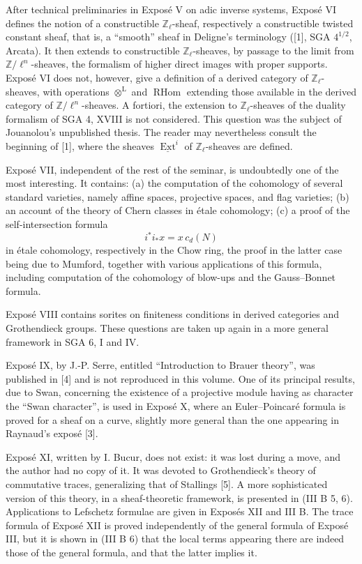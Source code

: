 \documentclass[11pt]{article}
\newcommand{\Z}{\mathbb{Z}}
\DeclareMathOperator{\RHom}{RHom}
\begin{document}
After technical preliminaries in Exposé V on adic inverse systems, Exposé VI defines the notion of a constructible $\Z_\ell$-sheaf, respectively a constructible twisted constant sheaf, that is, a ``smooth'' sheaf in Deligne's terminology ([1], SGA $4^{1/2}$, Arcata). It then extends to constructible $\Z_\ell$-sheaves, by passage to the limit from $\Z/\ell^n$-sheaves, the formalism of higher direct images with proper supports. Exposé VI does not, however, give a definition of a derived category of $\Z_\ell$-sheaves, with operations $\otimes^{\mathrm L}$ and $\RHom$ extending those available in the derived category of $\Z/\ell^n$-sheaves. A fortiori, the extension to $\Z_\ell$-sheaves of the duality formalism of SGA 4, XVIII is not considered. This question was the subject of Jouanolou's unpublished thesis. The reader may nevertheless consult the beginning of [1], where the sheaves $\underline{\operatorname{Ext}}^i$ of $\Z_\ell$-sheaves are defined.

Exposé VII, independent of the rest of the seminar, is undoubtedly one of the most interesting. It contains: (a) the computation of the cohomology of several standard varieties, namely affine spaces, projective spaces, and flag varieties; (b) an account of the theory of Chern classes in étale cohomology; (c) a proof of the self-intersection formula
\[
i^*i_*x=x\,c_d(N)
\]
in étale cohomology, respectively in the Chow ring, the proof in the latter case being due to Mumford, together with various applications of this formula, including computation of the cohomology of blow-ups and the Gauss--Bonnet formula.

Exposé VIII contains sorites on finiteness conditions in derived categories and Grothendieck groups. These questions are taken up again in a more general framework in SGA 6, I and IV.

Exposé IX, by J.-P. Serre, entitled ``Introduction to Brauer theory'', was published in [4] and is not reproduced in this volume. One of its principal results, due to Swan, concerning the existence of a projective module having as character the ``Swan character'', is used in Exposé X, where an Euler--Poincaré formula is proved for a sheaf on a curve, slightly more general than the one appearing in Raynaud's exposé [3].

Exposé XI, written by I. Bucur, does not exist: it was lost during a move, and the author had no copy of it. It was devoted to Grothendieck's theory of commutative traces, generalizing that of Stallings [5]. A more sophisticated version of this theory, in a sheaf-theoretic framework, is presented in (III B 5, 6). Applications to Lefschetz formulae are given in Exposés XII and III B. The trace formula of Exposé XII is proved independently of the general formula of Exposé III, but it is shown in (III B 6) that the local terms appearing there are indeed those of the general formula, and that the latter implies it.
\end{document}
